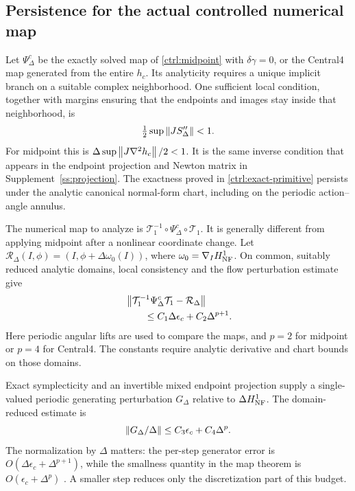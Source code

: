 \subsection{Persistence for the actual controlled numerical map}
\label{kam:map-section}

Let $\Psi_\Delta^c$ be the exactly solved map of \eqref{ctrl:midpoint} with $\delta\gamma=0$, or the Central4 map generated from the entire $h_c$. Its analyticity requires a unique implicit branch on a suitable complex neighborhood. One sufficient local condition, together with margins ensuring that the endpoints and images stay inside that neighborhood, is
\begin{equation}\label{kam:implicit-branch}
 \tfrac12\sup\left\lVert J S_\Delta''\right\rVert<1.
\end{equation}
For midpoint this is $\Delta\sup\left\lVert J\nabla^2h_c\right\rVert/2<1$. It is the same inverse condition that appears in the endpoint projection and Newton matrix in Supplement~\ref{ss:projection}. The exactness proved in \eqref{ctrl:exact-primitive} persists under the analytic canonical normal-form chart, including on the periodic action--angle annulus.

The numerical map to analyze is
$\mathcal T_1^{-1}\circ\Psi_\Delta^c\circ\mathcal T_1$.
It is generally different from applying midpoint after a nonlinear coordinate change. Let
$\mathcal R_\Delta(I,\phi)=(I,\phi+\Delta\omega_0(I))$,
where $\omega_0=\nabla_I H_{\rm NF}^{1}$. On common, suitably reduced analytic domains, local consistency and the flow perturbation estimate give
\begin{equation}\label{kam:map-closeness}
\begin{aligned}
 &\left\lVert\mathcal T_1^{-1}\Psi_\Delta^c\mathcal T_1
            -\mathcal R_\Delta\right\rVert\\
 &\qquad\le C_1\Delta\epsilon_c+C_2\Delta^{p+1}.
\end{aligned}
\end{equation}
Here periodic angular lifts are used to compare the maps, and $p=2$ for midpoint or $p=4$ for Central4. The constants require analytic derivative and chart bounds on those domains.

Exact symplecticity and an invertible mixed endpoint projection supply a single-valued periodic generating perturbation $G_\Delta$ relative to $\Delta H_{\rm NF}^{1}$. The domain-reduced estimate is
\begin{equation}\label{kam:map-generator-budget}
 \left\lVert G_\Delta/\Delta\right\rVert
       \le C_3\epsilon_c+C_4\Delta^p.
\end{equation}
The normalization by $\Delta$ matters: the per-step generator error is $O(\Delta\epsilon_c+\Delta^{p+1})$, while the smallness quantity in the map theorem is $O(\epsilon_c+\Delta^p)$ \citep[Section~4]{shang}. A smaller step reduces only the discretization part of this budget.

